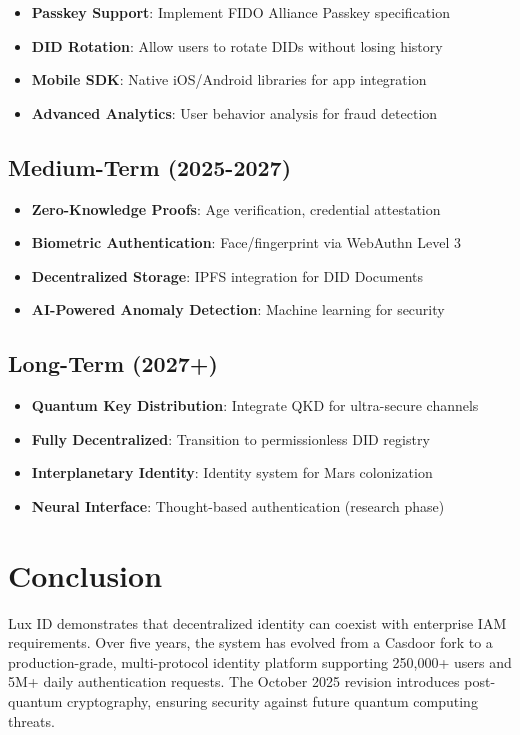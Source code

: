 \documentclass[11pt,a4paper]{article}
\begin{document}
\begin{itemize}
  \item \textbf{Passkey Support}: Implement FIDO Alliance Passkey specification
  \item \textbf{DID Rotation}: Allow users to rotate DIDs without losing history
  \item \textbf{Mobile SDK}: Native iOS/Android libraries for app integration
  \item \textbf{Advanced Analytics}: User behavior analysis for fraud detection
\end{itemize}

\subsection{Medium-Term (2025-2027)}

\begin{itemize}
  \item \textbf{Zero-Knowledge Proofs}: Age verification, credential attestation
  \item \textbf{Biometric Authentication}: Face/fingerprint via WebAuthn Level 3
  \item \textbf{Decentralized Storage}: IPFS integration for DID Documents
  \item \textbf{AI-Powered Anomaly Detection}: Machine learning for security
\end{itemize}

\subsection{Long-Term (2027+)}

\begin{itemize}
  \item \textbf{Quantum Key Distribution}: Integrate QKD for ultra-secure channels
  \item \textbf{Fully Decentralized}: Transition to permissionless DID registry
  \item \textbf{Interplanetary Identity}: Identity system for Mars colonization
  \item \textbf{Neural Interface}: Thought-based authentication (research phase)
\end{itemize}

\section{Conclusion}

Lux ID demonstrates that decentralized identity can coexist with enterprise IAM requirements. Over five years, the system has evolved from a Casdoor fork to a production-grade, multi-protocol identity platform supporting 250,000+ users and 5M+ daily authentication requests. The October 2025 revision introduces post-quantum cryptography, ensuring security against future quantum computing threats.
\end{document}
